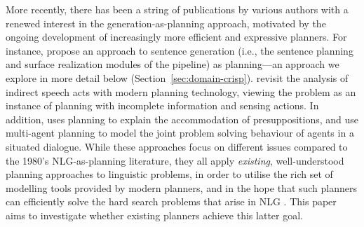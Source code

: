 More recently, there has been a string of publications by various authors
with a renewed interest in the generation-as-planning approach, motivated
by the ongoing development of increasingly more efficient and expressive
planners. For instance, \cite{KolSto07} propose an approach to sentence
generation (i.e., the sentence planning and surface realization modules of
the pipeline) as planning---an approach we explore in more detail below
(Section~\ref{sec:domain-crisp}). \citet{Steedman-Petrick:07} revisit the
analysis of indirect speech acts with modern planning technology, viewing
the problem as an instance of planning with incomplete information and
sensing actions. In addition, \citet{benotti08b} uses planning to explain
the accommodation of presuppositions, and
\citet{brenner08:_contin_multiag_plann_approac_to_situat_dialog} use
multi-agent planning to model the joint problem solving behaviour of agents
in a situated dialogue. While these approaches focus on different issues
compared to the 1980's NLG-as-planning literature, they all apply
\emph{existing}, well-understood planning approaches to linguistic
problems, in order to utilise the rich set of modelling tools provided by
modern planners, and in the hope that such planners can efficiently solve
the hard search problems that arise in NLG \citep{KolStr02}. This paper
aims to investigate whether existing planners achieve this latter goal.


